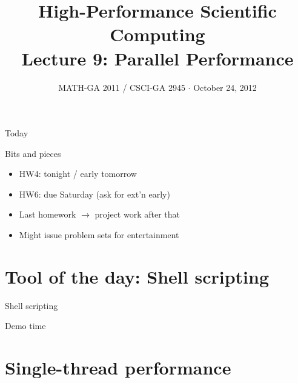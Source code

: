 \documentclass[english,compress]{beamer}
\begin{document}

\title{High-Performance Scientific Computing\\Lecture 9: Parallel Performance}

\date{MATH-GA 2011 / CSCI-GA 2945 $\cdot$ October 24, 2012}

\frame{\titlepage}

\begin{frame}{Today}
  \tableofcontents[hideallsubsections]
\end{frame}
\begin{frame}{Bits and pieces}
  \begin{itemize}
    \item HW4: tonight / early tomorrow
    \item HW6: due Saturday (ask for ext'n early)
    \item Last homework $\rightarrow$ project work after that
    \item Might issue problem sets for entertainment
  \end{itemize}
\end{frame}
\section[Software]{Tool of the day: Shell scripting}
\begin{frame}{Shell scripting}
  \begin{center}
  \Huge Demo time
  \end{center}
\end{frame}
\section{Single-thread performance}
\end{document}
